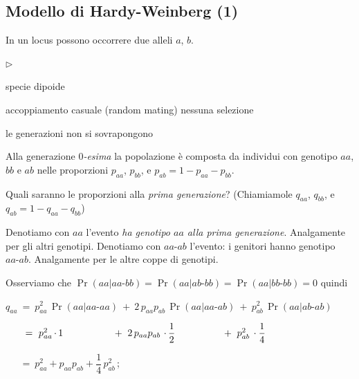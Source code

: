 \documentclass[11pt,openany]{book}
\newcommand{\mylabel}[1]{{\footnotesize\textsf{#1}}\hfill}
\newenvironment{citemize}
  {\begin{list}{$\triangleright$}{%
   \setlength{\parskip}{0mm}
   \setlength{\topsep}{.2\baselineskip}
   \setlength{\rightmargin}{0mm}
   \setlength{\listparindent}{0mm}
   \setlength{\itemindent}{0mm}
   \setlength{\labelwidth}{3ex}
   \setlength{\itemsep}{.1\baselineskip}
   \setlength{\parsep}{0mm}
   \setlength{\partopsep}{0mm}
   \setlength{\labelsep}{1ex}
   \setlength{\leftmargin}{\labelwidth+\labelsep}
   \let\makelabel\mylabel}}{%
   \end{list}\vspace*{-1.3mm}}
\begin{document}
\subsection{Modello di Hardy-Weinberg (1)}
\label{HW_totali1}

In un locus possono occorrere due alleli $a$, $b$. 

\begin{citemize}
\item specie dipoide
\item accoppiamento casuale (random mating) nessuna selezione
\item le generazioni non si sovrapongono
\end{citemize}


Alla generazione \textit{$0$-esima\/} la popolazione è composta da individui con genotipo $aa$, $bb$ e $ab$ nelle proporzioni $p_{aa}$, $p_{bb}$, e  $p_{ab}=1-p_{aa}-p_{bb}$.

Quali saranno le proporzioni alla \textit{prima generazione}? (Chiamiamole $q_{aa}$, $q_{bb}$, e $q_{ab}=1-q_{aa}-q_{bb}$)

\def\-{\mbox{-}}

Denotiamo con $aa$ l'evento \textit{ha genotipo $aa$ alla prima generazione}. Analgamente per gli altri genotipi. Denotiamo con $aa\-ab$ l'evento: i genitori hanno genotipo $aa\mbox{-}ab$. Analgamente per le altre coppe di genotipi.

Osserviamo che $\Pr(aa | aa\-bb)=\Pr(aa | ab\-bb)=\Pr(aa | bb\-bb)=0$ quindi

$q_{aa}\ =\ %
p_{aa}^2\, \Pr(aa | aa\-aa)\ +\ 
2\,p_{aa}p_{ab}\, \Pr(aa | aa\-ab)\ +\ 
p^2_{ab}\, \Pr(aa | ab\-ab)$


$\phantom{q_{aa}}\ =\ %
p_{aa}^2\,\rlap{$\cdot\,1$}\phantom{\Pr(aa | aa,aa)}\ +\ 
2\,p_{aa}p_{ab}\, \rlap{$\,\cdot\,\dfrac12$}\ \phantom{\Pr(aa | aa\-ab)}\ +\ 
p^2_{ab}\, \cdot\dfrac14$ 

$\phantom{q_{aa}}\ =\ p_{aa}^2+p_{aa}p_{ab} +\dfrac{1}{4}\,p^2_{ab}\,$;

% 
% 
% 
\end{document}
